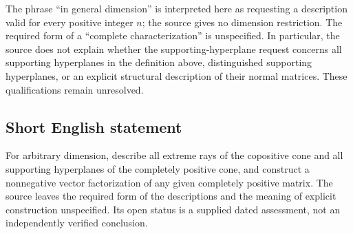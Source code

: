 \documentclass[11pt]{article}
\begin{document}
The phrase ``in general dimension'' is interpreted here as requesting a description valid for every positive integer \(n\); the source gives no dimension restriction. The required form of a ``complete characterization'' is unspecified. In particular, the source does not explain whether the supporting-hyperplane request concerns all supporting hyperplanes in the definition above, distinguished supporting hyperplanes, or an explicit structural description of their normal matrices. These qualifications remain unresolved.
\subsection{Short English statement}
For arbitrary dimension, describe all extreme rays of the copositive cone and all supporting hyperplanes of the completely positive cone, and construct a nonnegative vector factorization of any given completely positive matrix. The source leaves the required form of the descriptions and the meaning of explicit construction unspecified. Its open status is a supplied dated assessment, not an independently verified conclusion.
\end{document}

